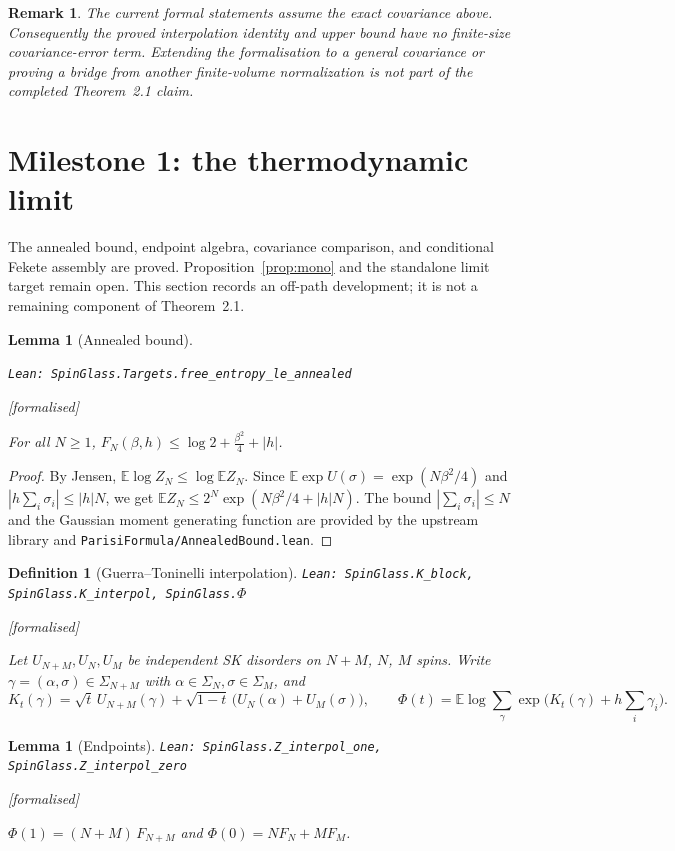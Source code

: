 \documentclass[11pt]{article}
\providecommand{\lean}[1]{\leavevmode\par\nopagebreak
  {\noindent\normalfont\footnotesize\raggedright\texttt{Lean: #1}\par}\nopagebreak}
\providecommand{\leanok}{\par\nopagebreak
  {\noindent\normalfont\footnotesize\textcolor{green!50!black}{[formalised]}\par}\nopagebreak}
\newtheorem{lemma}[theorem]{Lemma}
\newtheorem{definition}[theorem]{Definition}
\newtheorem{remark}[theorem]{Remark}
\newcommand{\E}{\mathbb{E}}
\newcommand{\Sig}{\Sigma_N}
\begin{document}
\begin{remark}
The current formal statements assume the exact covariance above. Consequently the
proved interpolation identity and upper bound have no finite-size covariance-error
term. Extending the formalisation to a general covariance or proving a bridge from
another finite-volume normalization is not part of the completed Theorem~2.1 claim.
\end{remark}

\section{Milestone 1: the thermodynamic limit}

The annealed bound, endpoint algebra, covariance comparison, and conditional
Fekete assembly are proved. Proposition~\ref{prop:mono} and the standalone limit
target remain open. This section records an off-path development; it is not a
remaining component of Theorem~2.1.

\begin{lemma}[Annealed bound]\label{lem:annealed}
\lean{SpinGlass.Targets.free\_entropy\_le\_annealed}\leanok
For all $N\ge1$, $F_N(\beta,h)\le\log2+\frac{\beta^2}{4}+|h|$.
\end{lemma}
\begin{proof}
By Jensen, $\E\log Z_N\le\log\E Z_N$.  Since $\E\exp U(\sigma)=\exp(N\beta^2/4)$ and
$|h\sum_i\sigma_i|\le|h|N$, we get $\E Z_N\le 2^N\exp(N\beta^2/4+|h|N)$.
The bound $|\sum_i\sigma_i|\le N$ and the Gaussian moment generating function are
provided by the upstream library and \texttt{ParisiFormula/AnnealedBound.lean}.
\end{proof}

\begin{definition}[Guerra--Toninelli interpolation]
\lean{SpinGlass.K\_block, SpinGlass.K\_interpol, SpinGlass.\ensuremath{\Phi}}\leanok
Let $U_{N+M},U_N,U_M$ be independent SK disorders on $N+M$, $N$, $M$ spins.
Write $\gamma=(\alpha,\sigma)\in\Sigma_{N+M}$ with $\alpha\in\Sig,\sigma\in\Sigma_M$, and
\[
K_t(\gamma)=\sqrt t\,U_{N+M}(\gamma)+\sqrt{1-t}\,\big(U_N(\alpha)+U_M(\sigma)\big),
\qquad
\Phi(t)=\E\log\sum_\gamma\exp\Big(K_t(\gamma)+h\sum_i\gamma_i\Big).
\]
\end{definition}

\begin{lemma}[Endpoints]
\lean{SpinGlass.Z\_interpol\_one, SpinGlass.Z\_interpol\_zero}\leanok
$\Phi(1)=(N+M)\,F_{N+M}$ and $\Phi(0)=N F_N+M F_M$.
\end{lemma}
\end{document}
